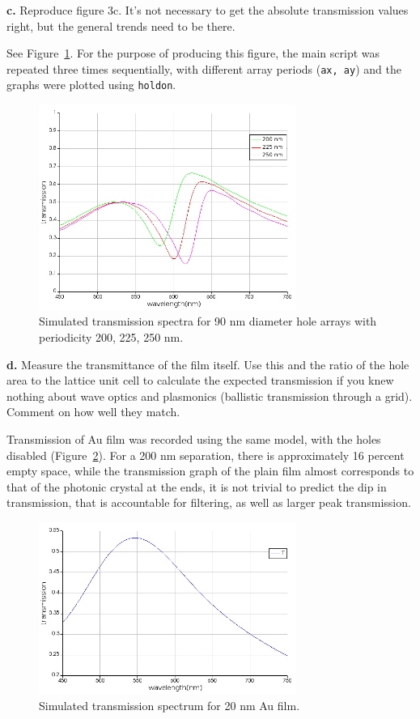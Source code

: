 \documentclass[11pt,a4paper]{article}
\begin{document}
\begin{displayquote}
    \textbf{c.} Reproduce figure 3c. It’s not necessary to get the absolute transmission values right, but the general trends need to be there.
\end{displayquote}

See Figure~\ref{fig:three}. For the purpose of producing this figure, the main script was repeated three times sequentially, with different array periods (\verb|ax, ay|) and the graphs were plotted using \verb|holdon|. 
\begin{figure}
    \centering
    \includegraphics[width=0.75\textwidth]{Three_pitches.png}
    \caption{Simulated transmission spectra for 90 nm diameter hole arrays with periodicity 200, 225, 250 nm.}
    \label{fig:three}
\end{figure}

\begin{displayquote}
    \textbf{d.} Measure the transmittance of the film itself. Use this and the ratio of the hole area to the lattice unit cell to calculate the expected transmission if you knew nothing about wave optics and plasmonics (ballistic transmission through a grid). Comment on how well they match.
\end{displayquote}
Transmission of Au film was recorded using the same model, with the holes disabled (Figure~\ref{fig:aufilm}). For a 200 nm separation, there is approximately 16 percent empty space, while the transmission graph of the plain film almost corresponds to that of the photonic crystal at the ends, it is not trivial to predict the dip in transmission, that is accountable for filtering, as well as larger peak transmission. 

\begin{figure}
    \centering
    \includegraphics[width=0.75\textwidth]{transmission_of_au_film.png}
    \caption{Simulated transmission spectrum for 20 nm Au film.}
    \label{fig:aufilm}
\end{figure}
\end{document}
